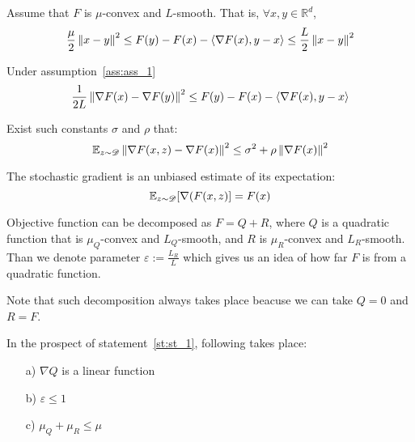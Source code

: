 
\begin{assumption} \label{ass:ass_1}
    Assume that $F$ is $\mu$-convex and $L$-smooth. That is, $\forall x, y \in \mathbb{R}^d$,
    \[
    \frac{\mu}{2} \left\|x - y\right\|^2 \leq F(y) - F(x) - \langle \nabla F(x), y-x\rangle \leq \frac{L}{2} \left\|x-y\right\|^2
    \]
\end{assumption}

\begin{corollary} \label{cor:nesterov}
Under assumption~\ref{ass:ass_1}
    \[
    \frac{1}{2L} \left\|\nabla F(x) - \nabla F(y)\right\|^2 \leq F(y) - F(x) - \langle \nabla F(x), y-x\rangle
    \]
\end{corollary}


\begin{assumption} \label{ass:ass_2}
    Exist such constants $\sigma$ and $\rho$ that:
    \[\mathbb{E}_{z \sim \mathcal{D}} \left\|\nabla F(x, z) - \nabla F(x)\right\|^2 \leq \sigma^2
    + \rho \left\|\nabla F(x)\right\|^2 \]
\end{assumption}

\begin{assumption} \label{ass:ass_3}
    The stochastic gradient is an unbiased estimate of its expectation:
    \[ \mathbb{E}_{z \sim \mathcal{D}}[\nabla(F(x, z)] = F(x)\]
\end{assumption}

\begin{statement} \label{st:st_1}
    Objective function can be decomposed as $F = Q + R$, where $Q$ is a quadratic function that is $\mu_Q$-convex and $L_Q$-smooth, and $R$ is $\mu_R$-convex and $L_R$-smooth. Than we denote parameter
    \(\varepsilon := \frac{L_R}{L}\)
    which gives us an idea of how far $F$ is from a quadratic function.
\end{statement}

Note that such decomposition always takes place beacuse we can take $Q = 0$ and $R = F$.


\begin{corollary} \label{cor:linearity}
    In the prospect of statement~\ref{st:st_1}, following takes place: $\,$
    \begin{enumerate}
    \item[a)] $\nabla Q$ is a linear function
    \item[b)] \(\varepsilon \leq 1\)

    \item[c)] \(\mu_Q + \mu_R \leq \mu\)
\end{enumerate}
\end{corollary}